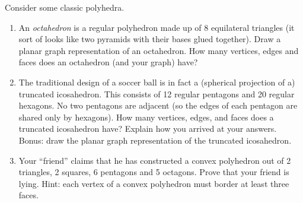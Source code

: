 \documentclass{book}
\begin{document}
\setcounter{project}{34}
\addtocounter{project}{-1}
\begin{activity}[]\label{activity-29}
\hypertarget{p-328}{}%
Consider some classic polyhedra.%
\begin{enumerate}[font=\bfseries,label=(\alph*),ref=\alph*]
\item\label{task-44} \hypertarget{p-329}{}%
An \emph{octahedron} is a regular polyhedron made up of 8 equilateral triangles (it sort of looks like two pyramids with their bases glued together). Draw a planar graph representation of an octahedron. How many vertices, edges and faces does an octahedron (and your graph) have?%
\item\label{task-45} \hypertarget{p-332}{}%
The traditional design of a soccer ball is in fact a (spherical projection of a) truncated icosahedron. This consists of 12 regular pentagons and 20 regular hexagons. No two pentagons are adjacent (so the edges of each pentagon are shared only by hexagons). How many vertices, edges, and faces does a truncated icosahedron have? Explain how you arrived at your answers. Bonus: draw the planar graph representation of the truncated icosahedron.%
\item\label{task-46} \hypertarget{p-334}{}%
Your ``friend'' claims that he has constructed a convex polyhedron out of 2 triangles, 2 squares, 6 pentagons and 5 octagons. Prove that your friend is lying. Hint: each vertex of a convex polyhedron must border at least three faces.%
\end{enumerate}
\end{activity}
\end{document}
